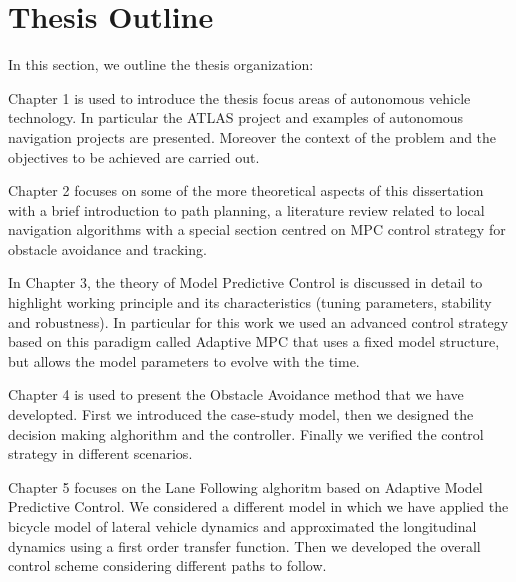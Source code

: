\section{Thesis Outline}\label{sec:outline}

In this section, we outline the thesis organization: 

Chapter 1 is used to introduce the thesis focus areas of autonomous vehicle technology. In particular the ATLAS project and examples of autonomous navigation projects are presented. Moreover the context of the problem and the objectives to be achieved are carried out.

Chapter 2 focuses on some of the more theoretical aspects of this dissertation with a brief introduction to path planning, a literature review related to local navigation algorithms with a special section centred on MPC control strategy for obstacle avoidance and tracking.

In Chapter 3, the theory of Model Predictive Control is discussed in detail to highlight working principle and its characteristics (tuning parameters, stability and robustness). In particular for this work we used an advanced control strategy based on this paradigm called Adaptive MPC that uses a fixed model structure, but allows the model parameters to evolve with the time.

Chapter 4 is used to present the Obstacle Avoidance method that we have developted. First we introduced the case-study model, then we designed the decision making alghorithm and the controller. Finally we verified the control strategy in different scenarios.

Chapter 5 focuses on the Lane Following alghoritm based on Adaptive Model Predictive Control. We considered a different model in which we have applied the bicycle model of lateral vehicle dynamics and approximated the longitudinal dynamics using a first order transfer function.
Then we developed the overall control scheme considering different paths to follow.
